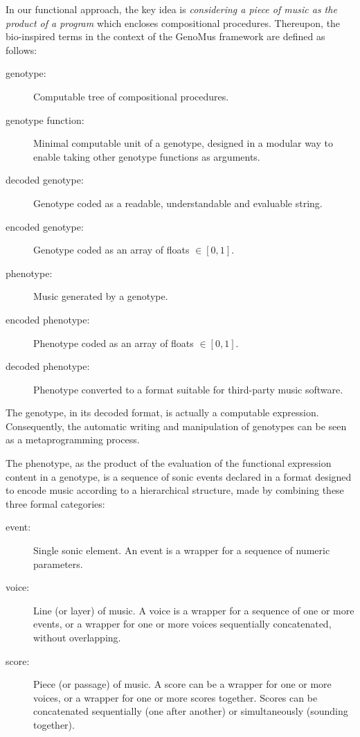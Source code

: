 \documentclass{article}
\begin{document}
In our functional approach, the key idea is \emph{considering a piece of music as the product of a program} which encloses compositional procedures. Thereupon, the bio-inspired terms in the context of the GenoMus framework are defined as follows: 


\begin{description}
\item[genotype:] Computable tree of compositional procedures.
\item[genotype function:] Minimal computable unit of a genotype, designed in a modular way to enable taking other genotype functions as arguments. 
\item[decoded genotype:] Genotype coded as a readable, understandable and evaluable string.
\item[encoded genotype:] Genotype coded as an array of floats $\in [0, 1]$.
\item[phenotype:] Music generated by a genotype.
\item[encoded phenotype:] Phenotype coded as an array of floats $\in [0, 1]$.
\item[decoded phenotype:] Phenotype converted to a format suitable for third-party music software.
\end{description}

The {genotype}, in its decoded format, is actually a computable expression. Consequently, the automatic writing and manipulation of genotypes can be seen as a metaprogramming process.

The {phenotype}, as the product of the evaluation of the functional expression content in a genotype, is a sequence of sonic events declared in a format designed to encode music according to a hierarchical structure, made by combining these three formal categories:

\begin{description}
\item[event:] Single sonic element. An event is a wrapper for a sequence of numeric parameters.
\item[voice:] Line (or layer) of music. A voice is a wrapper for a sequence of one or more events, or a wrapper for one or more voices sequentially concatenated, without overlapping.
\item[score:] Piece (or passage) of music. A score can be a wrapper for one or more voices, or a wrapper for one or more scores together. Scores can be concatenated sequentially (one after another) or simultaneously (sounding together).
\end{description}
\end{document}
